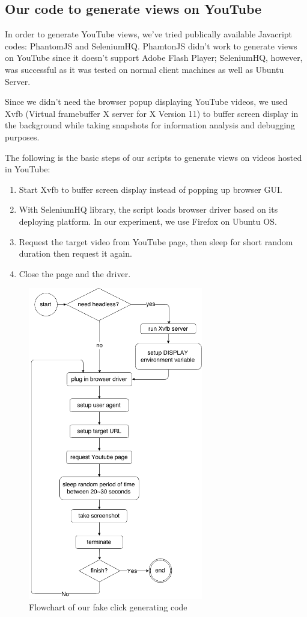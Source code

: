 \documentclass[conference]{IEEEtran}
\begin{document}
\subsection{Our code to generate views on YouTube}

In order to generate YouTube views, we've tried publically available Javacript codes: PhantomJS and SeleniumHQ. PhamtonJS didn’t work to generate views on YouTube since it doesn’t support Adobe Flash Player; SeleniumHQ, however, was successful as it was tested on normal client machines as well as Ubuntu Server.

Since we didn’t need the browser popup displaying YouTube videos, we used Xvfb (Virtual framebuffer X server for X Version 11) to buffer screen display in the background while taking snapshots for information analysis and debugging purposes.

The following is the basic steps of our scripts to generate views on videos hosted in YouTube:

\begin{enumerate}
  \item Start Xvfb to buffer screen display instead of popping up browser GUI.
  \item With SeleniumHQ library, the script loads browser driver based on its deploying platform. In our experiment, we use Firefox on Ubuntu OS.
  \item Request the target video from YouTube page, then sleep for short random duration then request it again.
  \item Close the page and the driver.
\end{enumerate}

\begin{figure}
  \centering
  \includegraphics[width=3.0in]{flowchart}
  \caption{Flowchart of our fake click generating code}
\end{figure}
\end{document}
